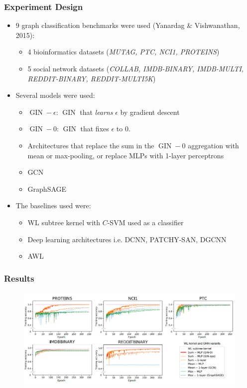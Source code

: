 \documentclass{beamer}
\DeclareMathOperator{\gin}{GIN}
\begin{document}


\begin{frame}
\frametitle{Experiment Design}

\begin{itemize}
	\item 9 graph classification benchmarks were used (Yanardag \& Vishwanathan, 2015):
	\begin{itemize}
		\item 4 bioinformatics datasets ({\it MUTAG, PTC, NCI1, PROTEINS})
		\item 5 social network datasets ({\it COLLAB, IMDB-BINARY, IMDB-MULTI, REDDIT-BINARY, REDDIT-MULTI5K})
	\end{itemize} \pause
	
	\item Several models were used:
	\begin{itemize}
		\item $\gin-\epsilon$: $\gin$ that {\it learns} $\epsilon$ by gradient descent
		\item $\gin-0$: $\gin$ that fixes $\epsilon$ to $0$.
		\item Architectures that replace the sum in the $\gin-0$ aggregation with mean or max-pooling, or replace MLPs with 1-layer perceptrons
		\item GCN
		\item GraphSAGE
	\end{itemize} \pause
	
	\item The baselines used were:
	\begin{itemize}
		\item WL subtree kernel with $C$-SVM used as a classifier
		\item Deep learning architectures i.e. DCNN, PATCHY-SAN, DGCNN
		\item AWL
	\end{itemize}
\end{itemize}

\end{frame}



\begin{frame}
\frametitle{Results}

\begin{figure}[hbt]
  \includegraphics[height=5cm]{fig5.png}
\end{figure}

\end{frame}
\end{document}
